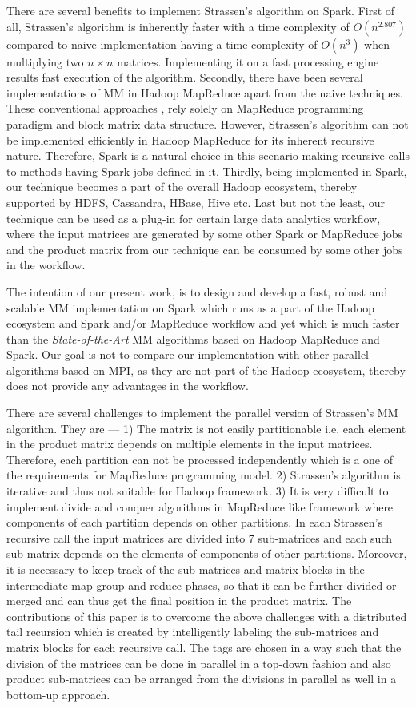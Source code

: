 There are several benefits to implement Strassen's algorithm on Spark. First of all, Strassen's algorithm is inherently faster with a time complexity of $O(n^{2.807})$ compared to naive implementation having a time complexity of $O(n^{3})$ when multiplying two $n \times n$ matrices. Implementing it on a fast processing engine results fast execution of the algorithm. Secondly, there have been several implementations of MM in Hadoop MapReduce apart from the naive techniques. These conventional approaches \cite{huang2015cumulon,seo2010hama}, rely solely on MapReduce programming paradigm and block matrix data structure. However, Strassen's algorithm can not be implemented efficiently in Hadoop MapReduce for its inherent recursive nature. Therefore, Spark is a natural choice in this scenario making recursive calls to methods having Spark jobs defined in it. Thirdly, being implemented in Spark, our technique becomes a part of the overall Hadoop ecosystem, thereby supported by HDFS, Cassandra, HBase, Hive etc. Last but not the least, our technique can be used as a plug-in for certain large data analytics workflow, where the input matrices are generated by some other Spark or MapReduce jobs and the product matrix from our technique can be consumed by some other jobs in the workflow.

The intention of our present work, is to design and develop a fast, robust and scalable MM implementation on Spark which runs as a part of the Hadoop ecosystem and Spark and/or MapReduce workflow and yet which is much faster than the \textit{State-of-the-Art} MM algorithms based on Hadoop MapReduce and Spark. Our goal is not to compare our implementation with other parallel algorithms based on MPI, as they are not part of the Hadoop ecosystem, thereby does not provide any advantages in the workflow.

There are several challenges to implement the parallel version of Strassen's MM algorithm. They are --- 1) The matrix is not easily partitionable i.e. each element in the product matrix depends on multiple elements in the input matrices. Therefore, each partition can not be processed independently which is a one of the requirements for MapReduce programming model. 2) Strassen's algorithm is iterative and thus not suitable for Hadoop framework. 3) It is very difficult to implement divide and conquer algorithms in MapReduce like framework where components of each partition depends on other partitions. In each Strassen's recursive call the input matrices are divided into 7 sub-matrices and each such sub-matrix depends on the elements of components of other partitions. Moreover, it is necessary to keep track of the sub-matrices and matrix blocks in the intermediate map group and reduce phases, so that it can be further divided or merged and can thus get the final position in the product matrix. The contributions of this paper is to overcome the above challenges with a distributed tail recursion which is created by intelligently labeling the sub-matrices and matrix blocks for each recursive call. The tags are chosen in a way such that the division of the matrices can be done in parallel in a top-down fashion and also product sub-matrices can be arranged from the divisions in parallel as well in a bottom-up approach.

